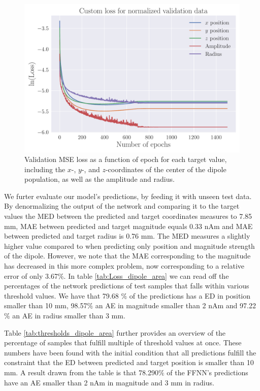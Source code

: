 \documentclass[a4paper, UKenglish, 11pt]{uiomaster}
\begin{document}
\begin{figure}[!htb]
    \centering
    \includegraphics[width=\linewidth]{figures/NN_area/Custom_Loss_mse_targets_area_seed_42_cnn_32_0.001_0.35_0.1_0_1500_(0).pdf}
    \caption{Validation MSE loss as a function of epoch for each target value, including the $x$-, $y$-, and $z$-coordinates of the center of the dipole population, as well as the amplitude and radius.}
    \label{fig:dipole_area_target_result}
\end{figure}

\FloatBarrier


We furter evaluate our model's predictions, by feeding it with unseen test data. By denormalizing the output of the network and comparing it to the target values the MED between the predicted and target coordinates measures to 7.85 mm, MAE between predicted and target magnitude equals 0.33 nAm and MAE between predicted and target radius is 0.76 mm. The MED measures a slightly higher value compared to when predicting only position and magnitude strength of the dipole. However, we note that the MAE corresponding to the magnitude has decreased in this more complex problem, now corresponding to a relative error of only 3.67$\%$. In table \ref{tab:Loss_dipole_area} we can read off the percentages of the network predictions of test samples that falls within various threshold values. We have that 79.68 $\%$ of the predictions has a ED in position smaller than 10 mm, 98.57$\%$ an AE in magnitude smaller than 2 nAm and 97.22$\%$ an AE in radius smaller than 3 mm.

Table \ref{tab:thresholds_dipole_area} further provides an overview of the percentage of samples that fulfill multiple of threshold values at once. These numbers have been found with the initial condition that all predictions fulfill the constraint that the ED between predicted and target position is smaller than 10 mm. A result drawn from the table is that 78.290$\%$ of the FFNN's predictions have an AE smaller than 2 nAm in magnitude and 3 mm in radius.
\end{document}
